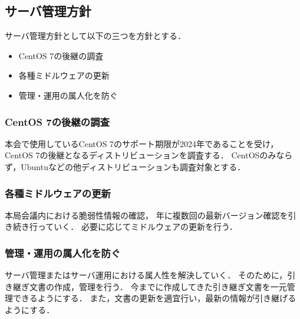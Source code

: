 \subsection*{サーバ管理方針}


サーバ管理方針として以下の三つを方針とする．
\begin{itemize}
    \item CentOS 7の後継の調査
    \item 各種ミドルウェアの更新
    \item 管理・運用の属人化を防ぐ
\end{itemize}

\subsubsection*{CentOS 7の後継の調査}
本会で使用しているCentOS 7のサポート期限が2024年であることを受け，
CentOS 7の後継となるディストリビューションを調査する．
CentOSのみならず，Ubuntuなどの他ディストリビューションも調査対象とする．

\subsubsection*{各種ミドルウェアの更新}
本局会議内における脆弱性情報の確認，
年に複数回の最新バージョン確認を引き続き行っていく．
必要に応じてミドルウェアの更新を行う．

\subsubsection*{管理・運用の属人化を防ぐ}
サーバ管理またはサーバ運用における属人性を解決していく．
そのために，引き継ぎ文書の作成，管理を行う．
今までに作成してきた引き継ぎ文書を一元管理できるようにする．
また，文書の更新を適宜行い，最新の情報が引き継げるようにする．
